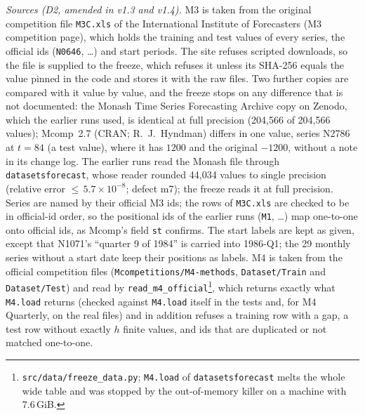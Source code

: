 \documentclass[11pt,a4paper]{article}
\newcommand{\code}[1]{\texttt{#1}}
\begin{document}
\emph{Sources (D2, amended in v1.3 and v1.4).} M3 is taken from the original competition file
\code{M3C.xls} of the International Institute of Forecasters (M3 competition page), which holds the
training and test values of every series, the official ids (\code{N0646}, \dots) and start periods.
The site refuses scripted downloads, so the file is supplied to the freeze, which refuses it unless its
SHA-256 equals the value pinned in the code and stores it with the raw files. Two further copies are
compared with it value by value, and the freeze stops on any difference that is not documented: the
Monash Time Series Forecasting Archive copy on Zenodo, which the earlier runs used, is identical at full
precision (204,566 of 204,566 values); Mcomp~2.7 (CRAN; R.~J.~Hyndman) differs in one value, series
N2786 at $t=84$ (a test value), where it has $1200$ and the original $-1200$, without a note in its
change log. The earlier runs read the Monash file through \code{datasetsforecast}, whose reader
rounded 44,034 values to single precision (relative error ${\le}\,5.7\times10^{-8}$; defect m7); the
freeze reads it at full precision. Series are named by their official M3 ids; the rows of
\code{M3C.xls} are checked to be in official-id order, so the positional ids of the earlier runs
(\code{M1}, \dots) map one-to-one onto official ids, as Mcomp's field \code{st} confirms. The start
labels are kept as given, except that N1071's ``quarter 9 of 1984'' is carried into 1986-Q1; the 29
monthly series without a start date keep their positions as labels. M4 is taken from the official
competition files (\code{Mcompetitions/M4-methods}, \code{Dataset/Train} and \code{Dataset/Test}) and read
by \code{read_m4_official}\footnote{\code{src/data/freeze_data.py}; \code{M4.load} of
\code{datasetsforecast} melts the whole wide table and was stopped by the out-of-memory killer on a
machine with 7.6\,GiB.}, which returns exactly what \code{M4.load} returns (checked against
\code{M4.load} itself in the tests and, for M4 Quarterly, on the real files) and in addition refuses a
training row with a gap, a test row without exactly $h$ finite values, and ids that are duplicated or
not matched one-to-one.
\end{document}
